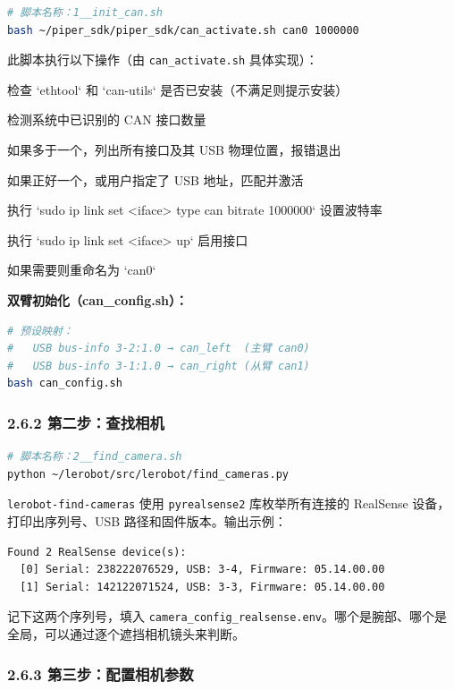 \documentclass[UTF8,a4paper,11pt]{ctexart}
\begin{document}
\begin{lstlisting}[language=bash]
# 脚本名称：1__init_can.sh
bash ~/piper_sdk/piper_sdk/can_activate.sh can0 1000000
\end{lstlisting}

此脚本执行以下操作（由 \texttt{can_activate.sh} 具体实现）：
\item[1] 检查 `ethtool` 和 `can-utils` 是否已安装（不满足则提示安装）
\item[2] 检测系统中已识别的 CAN 接口数量
\item[3] 如果多于一个，列出所有接口及其 USB 物理位置，报错退出
\item[4] 如果正好一个，或用户指定了 USB 地址，匹配并激活
\item[5] 执行 `sudo ip link set <iface> type can bitrate 1000000` 设置波特率
\item[6] 执行 `sudo ip link set <iface> up` 启用接口
\item[7] 如果需要则重命名为 `can0`

\textbf{双臂初始化（can_config.sh）：}
\begin{lstlisting}[language=bash]
# 预设映射：
#   USB bus-info 3-2:1.0 → can_left  (主臂 can0)
#   USB bus-info 3-1:1.0 → can_right (从臂 can1)
bash can_config.sh
\end{lstlisting}

\subsubsection{2.6.2 第二步：查找相机}

\begin{lstlisting}[language=bash]
# 脚本名称：2__find_camera.sh
python ~/lerobot/src/lerobot/find_cameras.py
\end{lstlisting}

\texttt{lerobot-find-cameras} 使用 \texttt{pyrealsense2} 库枚举所有连接的 RealSense 设备，打印出序列号、USB 路径和固件版本。输出示例：

\begin{lstlisting}[language=text]
Found 2 RealSense device(s):
  [0] Serial: 238222076529, USB: 3-4, Firmware: 05.14.00.00
  [1] Serial: 142122071524, USB: 3-3, Firmware: 05.14.00.00
\end{lstlisting}

记下这两个序列号，填入 \texttt{camera_config_realsense.env}。哪个是腕部、哪个是全局，可以通过逐个遮挡相机镜头来判断。

\subsubsection{2.6.3 第三步：配置相机参数}
\end{document}
